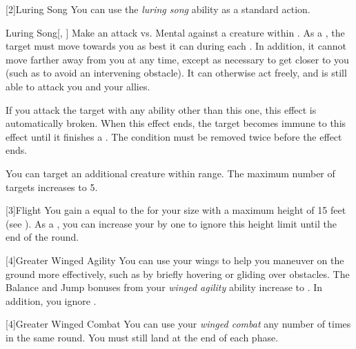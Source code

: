             [2]{Luring Song} You can use the \textit{luring song} ability as a standard action.
            \begin{magicalactiveability}{Luring Song}[, ]
                    \rankline
                    Make an attack vs. Mental against a creature within \longrange.
                    \hit As a , the target must move towards you as best it can during each .
                    In addition, it cannot move farther away from you at any time, except as necessary to get closer to you (such as to avoid an intervening obstacle).
                    It can otherwise act freely, and is still able to attack you and your allies.

                    If you attack the target with any ability other than this one, this effect is automatically broken.
                    When this effect ends, the target becomes immune to this effect until it finishes a .
                    \crit The condition must be removed twice before the effect ends.

                    \rankline
                     You can target an additional creature within range.
                     The maximum number of targets increases to 5.
                \end{magicalactiveability}

            [3]{Flight} You gain a  equal to the  for your size with a maximum height of 15 feet (see ).
            As a , you can increase your  by one to ignore this height limit until the end of the round.

            [4]{Greater Winged Agility} You can use your wings to help you maneuver on the ground more effectively, such as by briefly hovering or gliding over obstacles.
            The Balance and Jump bonuses from your \textit{winged agility} ability increase to .
            In addition, you ignore .

            [4]{Greater Winged Combat} You can use your \textit{winged combat} any number of times in the same round.
            You must still land at the end of each phase.

